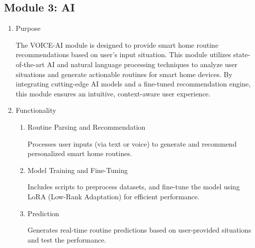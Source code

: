 \documentclass[conference]{IEEEtran}
\begin{document}
\subsection{Module 3: AI}
\vspace{0.5em}

\begin{enumerate}[label=\arabic*]
    \item Purpose\par
    \vspace{0.3em}
    The VOICE-AI module is designed to provide smart home routine recommendations based on user’s input situation. This module utilizes state-of-the-art AI and natural language processing techniques to analyze user situations and generate actionable routines for smart home devices. By integrating cutting-edge AI models and a fine-tuned recommendation engine, this module ensures an intuitive, context-aware user experience.
    
    \vspace{1em}

    \item Functionality\par
    \vspace{0.3em}

    \begin{enumerate}[label=\arabic*)]   
        \item Routine Parsing and Recommendation\par
        \vspace{0.3em}
        Processes user inputs (via text or voice) to generate and recommend personalized smart home routines.

        \vspace{1em}

        \item Model Training and Fine-Tuning\par
        \vspace{0.3em}
        Includes scripts to preprocess datasets, and fine-tune the model using LoRA (Low-Rank Adaptation) for efficient performance.

        \vspace{1em}

        \item Prediction\par
        \vspace{0.3em}
        Generates real-time routine predictions based on user-provided situations and test the performance.


\end{enumerate}
\end{enumerate}
\end{document}
